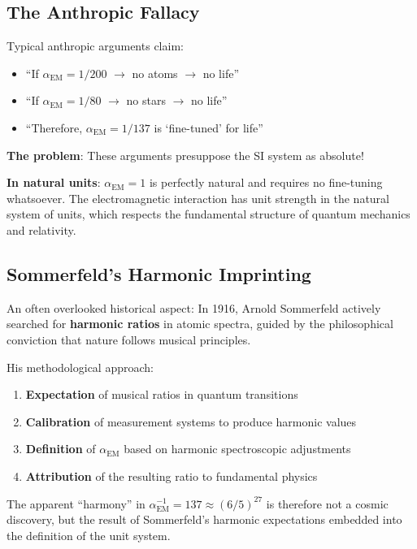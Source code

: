 \documentclass[12pt,a4paper]{article}
\begin{document}
\subsection{The Anthropic Fallacy}
\label{subsec:anthropic_fallacy}

Typical anthropic arguments claim:
\begin{itemize}
	\item ``If $\alpha_{\text{EM}} = 1/200$ $\rightarrow$ no atoms $\rightarrow$ no life''
	\item ``If $\alpha_{\text{EM}} = 1/80$ $\rightarrow$ no stars $\rightarrow$ no life''
	\item ``Therefore, $\alpha_{\text{EM}} = 1/137$ is `fine-tuned' for life''
\end{itemize}

\textbf{The problem}: These arguments presuppose the SI system as absolute!

\textbf{In natural units}: $\alpha_{\text{EM}} = 1$ is perfectly natural and requires no fine-tuning whatsoever. The electromagnetic interaction has unit strength in the natural system of units, which respects the fundamental structure of quantum mechanics and relativity.

\subsection{Sommerfeld's Harmonic Imprinting}
\label{subsec:sommerfeld_harmonic}

An often overlooked historical aspect: In 1916, Arnold Sommerfeld actively searched for \textbf{harmonic ratios} in atomic spectra, guided by the philosophical conviction that nature follows musical principles.

His methodological approach:
\begin{enumerate}
	\item \textbf{Expectation} of musical ratios in quantum transitions
	\item \textbf{Calibration} of measurement systems to produce harmonic values
	\item \textbf{Definition} of $\alpha_{\text{EM}}$ based on harmonic spectroscopic adjustments
	\item \textbf{Attribution} of the resulting ratio to fundamental physics
\end{enumerate}

The apparent ``harmony'' in $\alpha_{\text{EM}}^{-1} = 137 \approx (6/5)^{27}$ is therefore not a cosmic discovery, but the result of Sommerfeld's harmonic expectations embedded into the definition of the unit system.
\end{document}

